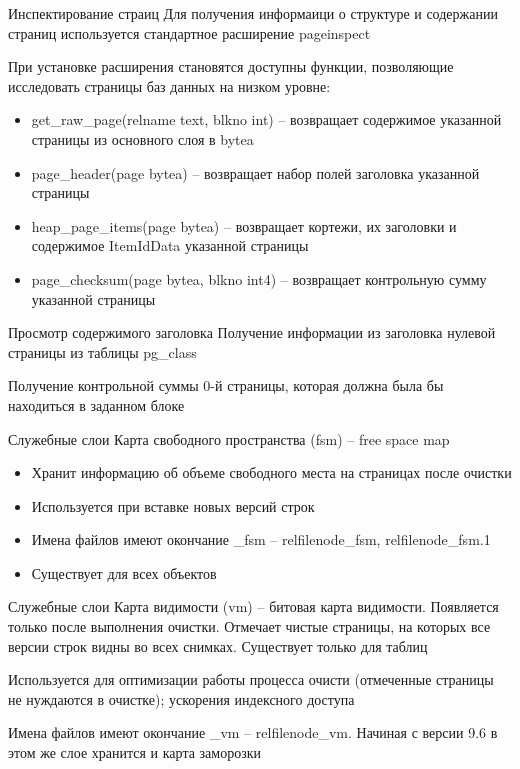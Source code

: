 \documentclass[12pt]{article}
\begin{document}
\begin{nota}{Инспектирование страиц}
    Для получения информаици о структуре и содержании страниц используется стандартное расширение pageinspect

    При установке расширения становятся доступны функции, позволяющие исследовать страницы баз данных на низком уровне:

    \begin{itemize}
        \item get\_raw\_page(relname text, blkno int) -- возвращает содержимое указанной страницы из основного слоя в bytea 
        \item page\_header(page bytea) -- возвращает набор полей заголовка указанной страницы 
        \item heap\_page\_items(page bytea) -- возвращает кортежи, их заголовки и содержимое ItemIdData указанной страницы 
        \item page\_checksum(page bytea, blkno int4) -- возвращает контрольную сумму указанной страницы 
    \end{itemize}
\end{nota}

\begin{nota}{Просмотр содержимого заголовка}
    Получение информации из заголовка нулевой страницы из таблицы pg\_class 

    Получение контрольной суммы 0-й страницы, которая должна была бы находиться в заданном блоке 
\end{nota}

\begin{nota}{Служебные слои}
    Карта свободного пространства (fsm) -- free space map 

    \begin{itemize}
        \item Хранит информацию об объеме свободного места на страницах после очистки 
        \item Используется при вставке новых версий строк 
        \item Имена файлов имеют окончание \_fsm -- relfilenode\_fsm, relfilenode\_fsm.1
        \item Существует для всех объектов
    \end{itemize}
\end{nota}

\begin{nota}{Служебные слои}
    Карта видимости (vm) -- битовая карта видимости. Появляется только после выполнения очистки. Отмечает чистые страницы, на которых все версии строк видны во всех снимках. Существует только для таблиц 

    Используется для оптимизации работы процесса очисти (отмеченные страницы не нуждаются в очистке); ускорения индексного доступа 

    Имена файлов имеют окончание \_vm -- relfilenode\_vm. Начиная с версии 9.6 в этом же слое хранится и карта заморозки
\end{nota}
\end{document}
